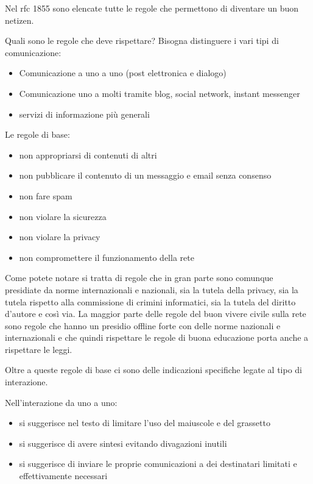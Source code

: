 Nel rfc 1855 sono elencate tutte le regole che permettono di diventare un buon netizen.\par
Quali sono le regole che deve rispettare?
Bisogna distinguere i vari tipi di comunicazione:
\begin{itemize}
    \item Comunicazione a uno a uno (post elettronica e dialogo)
    \item Comunicazione uno a molti tramite blog, social network, instant messenger
    \item servizi di informazione più generali
\end{itemize}

Le regole di base:
\begin{itemize}
    \item non appropriarsi di contenuti di altri
    \item non pubblicare il contenuto di un messaggio e email senza consenso
    \item non fare spam
    \item non violare la sicurezza
    \item non violare la privacy
    \item non compromettere il funzionamento della rete
\end{itemize}

Come potete notare si tratta di regole che in gran parte sono comunque presidiate da norme internazionali e nazionali, sia la tutela della privacy, sia la tutela rispetto alla commissione di crimini informatici, sia la tutela del diritto d'autore e così via. La maggior parte delle regole del buon vivere civile sulla rete sono regole che hanno un presidio offline forte con delle norme nazionali e internazionali e che quindi rispettare le regole di buona educazione porta anche a rispettare le leggi.\par
Oltre a queste regole di base ci sono delle indicazioni specifiche legate al tipo di interazione. \par
Nell'interazione da uno a uno:
\begin{itemize}
    \item si suggerisce nel testo di limitare l'uso del maiuscole e del grassetto
    \item si suggerisce di avere sintesi evitando divagazioni inutili
    \item si suggerisce di inviare le proprie comunicazioni a dei destinatari limitati e effettivamente necessari
\end{itemize}

